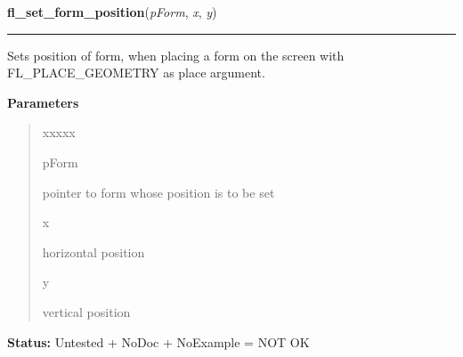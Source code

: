     \label{xformslib:library:fl_set_form_position}

    \vspace{0.5ex}

\hspace{.8\funcindent}\begin{boxedminipage}{\funcwidth}

    \raggedright \textbf{fl\_set\_form\_position}(\textit{pForm}, \textit{x}, \textit{y})

    \vspace{-1.5ex}

    \rule{\textwidth}{0.5\fboxrule}
\setlength{\parskip}{2ex}
    Sets position of form, when placing a form on the screen with 
    FL\_PLACE\_GEOMETRY as place argument.

\setlength{\parskip}{1ex}
      \textbf{Parameters}
      \vspace{-1ex}

      \begin{quote}
        \begin{Ventry}{xxxxx}

          \item[pForm]

          pointer to form whose position is to be set

          \item[x]

          horizontal position

          \item[y]

          vertical position

        \end{Ventry}

      \end{quote}

\textbf{Status:} Untested + NoDoc + NoExample = NOT OK



    \end{boxedminipage}

    \label{xformslib:library:fl_set_form_title}

    \vspace{0.5ex}

